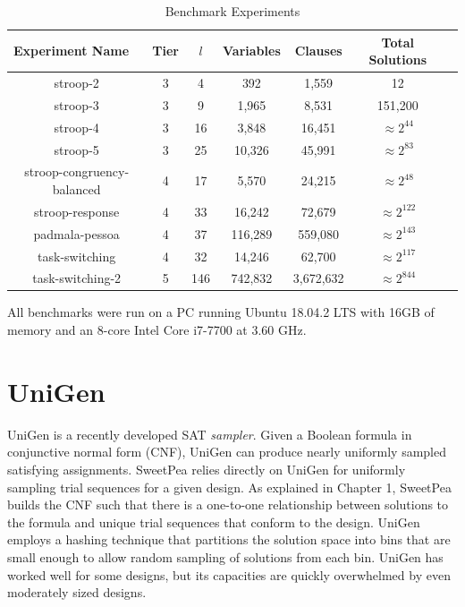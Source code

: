 \begin{table}[htb]
  \centering
  \caption{Benchmark Experiments}
\begin{tabular}{|c|c|c|c|c|c|c|}
\hline
\multicolumn{1}{|l|}{Experiment Name} & Tier            & $l$             & Variables  & Clauses    & Total Solutions    \\ \hline
stroop-2                              & 3               & 4               & 392        & 1,559      & 12                 \\ \hline
stroop-3                              & 3               & 9               & 1,965      & 8,531      & 151,200            \\ \hline
stroop-4                              & 3               & 16              & 3,848      & 16,451     & $\approx 2^{44}$   \\ \hline
stroop-5                              & 3               & 25              & 10,326     & 45,991     & $\approx 2^{83}$   \\ \hline
stroop-congruency-balanced            & 4               & 17              & 5,570      & 24,215     & $\approx 2^{48}$   \\ \hline
stroop-response                       & 4               & 33              & 16,242     & 72,679     & $\approx 2^{122}$  \\ \hline
padmala-pessoa                        & 4               & 37              & 116,289    & 559,080    & $\approx 2^{143}$  \\ \hline
task-switching                        & 4               & 32              & 14,246     & 62,700     & $\approx 2^{117}$  \\ \hline
task-switching-2                      & 5               & 146             & 742,832    & 3,672,632  & $\approx 2^{844}$  \\ \hline
\end{tabular}
\label{tab:benchmark_experiments}
\end{table}

All benchmarks were run on a PC running Ubuntu 18.04.2 LTS with 16GB of memory and an 8-core Intel Core i7-7700 at 3.60 GHz.


\section{UniGen}

UniGen \cite{chakraborty2013scalable,chakraborty_balancing_2014} is a recently developed SAT \textit{sampler}. Given a Boolean formula in conjunctive normal form (CNF), UniGen can produce nearly uniformly sampled satisfying assignments. SweetPea relies directly on UniGen for uniformly sampling trial sequences for a given design. As explained in Chapter 1, SweetPea builds the CNF such that there is a one-to-one relationship between solutions to the formula and unique trial sequences that conform to the design. UniGen employs a hashing technique that partitions the solution space into bins that are small enough to allow random sampling of solutions from each bin. UniGen has worked well for some designs, but its capacities are quickly overwhelmed by even moderately sized designs.

